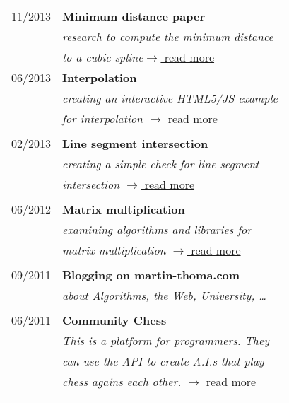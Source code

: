 \documentclass[a4paper,10pt]{article} %
\begin{document}
{\begin{minipage}[t]{0.44\textwidth}
\begin{tabular}{rl}
11/2013	 & \textbf{Minimum distance paper}\\
& \textit{research to compute the minimum distance}\\
& \textit{to a cubic spline}\hfill \href{https://github.com/MartinThoma/LaTeX-examples/tree/master/documents/math-minimal-distance-to-cubic-function}{$\rightarrow$ read more}\\

06/2013	 & \textbf{Interpolation}\\
& \textit{creating an interactive HTML5/JS-example}\\
& \textit{for interpolation} \hfill \href{http://martin-thoma.com/polynomial-interpolation/}{$\rightarrow$ read more} \\\\

02/2013	 & \textbf{Line segment intersection}\\
& \textit{creating a simple check for line segment}\\
& \textit{intersection} \hfill \href{http://martin-thoma.com/how-to-check-if-two-line-segments-intersect/}{$\rightarrow$ read more} \\\\

06/2012	 & \textbf{Matrix multiplication}\\
& \textit{examining algorithms and libraries for}\\
& \textit{matrix multiplication} \hfill \href{http://martin-thoma.com/matrix-multiplication-python-java-cpp/}{$\rightarrow$ read more}\\\\

09/2011	 & \textbf{Blogging on martin-thoma.com}\\
& \textit{about Algorithms, the Web, University, \dots}\\ \\


06/2011	 & \textbf{Community Chess}\\
& \textit{This is a platform for programmers. They}\\
& \textit{can use the API to create A.I.s that play}\\
& \textit{chess agains each other. } \hfill \href{https://github.com/MartinThoma/community-chess}{$\rightarrow$ read more}\\\\
\end{tabular}\\[10pt]


\end{minipage}}
\end{document}
